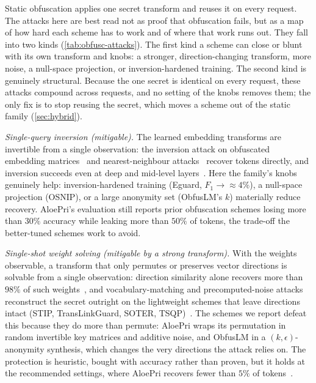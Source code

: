 Static obfuscation applies one secret transform and reuses it on every request. The attacks here
are best read not as proof that obfuscation fails, but as a map of how hard each scheme has to work
and of where that work runs out. They fall into two kinds (\cref{tab:obfusc-attacks}). The first
kind a scheme can close or blunt with its own transform and knobs: a stronger, direction-changing
transform, more noise, a null-space projection, or inversion-hardened training. The second kind is
genuinely structural. Because the one secret is identical on every request, these attacks compound
across requests, and no setting of the knobs removes them; the only fix is to stop reusing the
secret, which moves a scheme out of the static family (\cref{sec:hybrid}).

\emph{Single-query inversion (mitigable).} The learned embedding transforms are invertible from
a single observation: the inversion attack on obfuscated embedding
matrices~\citep{lin_inversion} and nearest-neighbour attacks~\citep{kornaropoulos_knn_2019,naveed_ppe_2015}
recover tokens directly, and inversion succeeds even at deep and mid-level
layers~\citep{depth_false_privacy}. Here the family's knobs genuinely help: inversion-hardened
training (Eguard, $F_1{\to}{\approx}4\%$), a null-space projection (OSNIP), or a large anonymity
set (ObfusLM's $k$) materially reduce recovery. AloePri's evaluation still reports prior obfuscation schemes losing more than $30\%$ accuracy while leaking more than $50\%$ of
tokens, the trade-off the better-tuned schemes work to avoid.

\emph{Single-shot weight solving (mitigable by a strong transform).} With the weights observable, a
transform that only permutes or preserves vector directions is solvable from a single observation:
direction similarity alone recovers more than $98\%$ of such weights~\citep{arrowmatch}, and
vocabulary-matching and precomputed-noise attacks reconstruct the secret outright on the lightweight
schemes that leave directions intact (STIP, TransLinkGuard, SOTER, TSQP)~\citep{hnm,saini_precomp_break}.
The schemes we report defeat this because they do more than permute: AloePri wraps its permutation in
random invertible key matrices and additive noise, and ObfusLM in a $(k,\epsilon)$-anonymity synthesis,
which changes the very directions the attack relies on. The protection is heuristic, bought with
accuracy rather than proven, but it holds at the recommended settings, where AloePri recovers fewer
than $5\%$ of tokens~\citep{lin_aloepri,obfuslm}.

